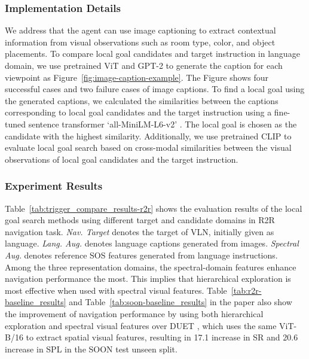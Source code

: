 \documentclass[10pt,twocolumn,letterpaper]{article}
\begin{document}
\subsubsection{Implementation Details}
We address that the agent can use image captioning to extract contextual information from visual observations such as room type, color, and object placements. To compare local goal candidates and target instruction in language domain, we use pretrained ViT \cite{dosovitskiy2020vit} and GPT-2 \cite{gpt2} to generate the caption for each viewpoint as Figure~\ref{fig:image-caption-example}. The Figure shows four successful cases and two failure cases of image captions. To find a local goal using the generated captions, we calculated the similarities between the captions corresponding to local goal candidates and the target instruction using a fine-tuned sentence transformer `all-MiniLM-L6-v2' \cite{reimers-2019-sentence-bert}. The local goal is chosen as the candidate with the highest similarity. Additionally, we use pretrained CLIP \cite{clip} to evaluate local goal search based on cross-modal similarities between the visual observations of local goal candidates and the target instruction. 

\subsubsection{Experiment Results}
Table~\ref{tab:trigger_compare_results-r2r} shows the evaluation results of the local goal search methods using different target and candidate domains in R2R navigation task. \textit{Nav. Target} denotes the target of VLN, initially given as language. \textit{Lang. Aug.} denotes language captions generated from images. \textit{Spectral Aug.} denotes reference SOS features generated from language instructions. Among the three representation domains, the spectral-domain features enhance navigation performance the most. This implies that hierarchical exploration is most effective when used with spectral visual features. Table~\ref{tab:r2r-baseline_results} and Table~\ref{tab:soon-baseline_results} in the paper also show the improvement of navigation performance by using both hierarchical exploration and spectral visual features over DUET \cite{chen2022thinkshort}, which uses the same ViT-B/16 to extract spatial visual features, resulting in 17.1 increase in SR and 20.6 increase in SPL in the SOON test unseen split.
\end{document}
